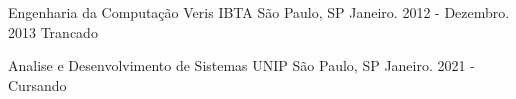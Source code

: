 

\begin{cventries}

  \cventry
    {Engenharia da Computação} %
    {Veris IBTA} %
    {São Paulo, SP} %
    {Janeiro. 2012 - Dezembro. 2013 \newline Trancado} %
    {
    }

\cventry
  {Analise e Desenvolvimento de Sistemas} %
  {UNIP} %
  {São Paulo, SP} %
  {Janeiro. 2021 - Cursando} %
  {
  }

\end{cventries}
